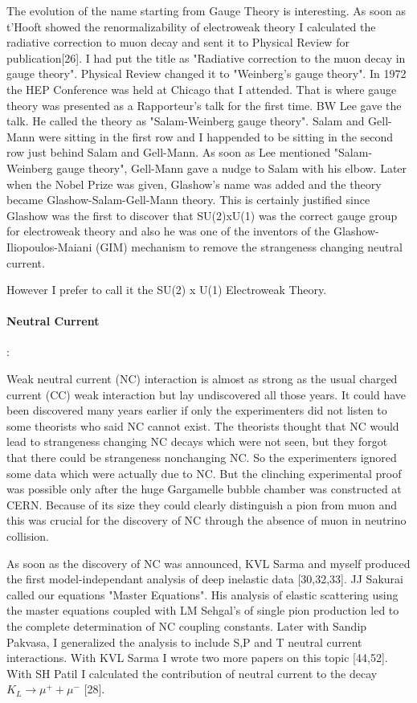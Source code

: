 The evolution of the name starting from Gauge Theory is interesting. As 
soon as t'Hooft showed the renormalizability of electroweak theory I 
calculated the radiative correction to muon decay and sent it to 
Physical Review for publication[26]. I had put the title as "Radiative 
correction to the muon decay in gauge theory". Physical Review changed 
it to "Weinberg's gauge theory". In 1972 the HEP Conference was held at 
Chicago that I attended. That is where gauge theory was presented as a 
Rapporteur's talk for the first time. BW Lee gave the talk. He called 
the theory as "Salam-Weinberg gauge theory". Salam and Gell-Mann were 
sitting in the first row and I happended to be sitting in the second row 
just behind Salam and Gell-Mann. As soon as Lee mentioned 
"Salam-Weinberg gauge theory", Gell-Mann gave a nudge to Salam with his 
elbow. Later when the Nobel Prize was given, Glashow's name was added 
and the theory became Glashow-Salam-Gell-Mann theory. This is certainly 
justified since Glashow was the first to discover that SU(2)xU(1) was 
the correct gauge group for electroweak theory and also he was one of 
the inventors of the Glashow-Iliopoulos-Maiani (GIM) mechanism to remove 
the strangeness changing neutral current.

However I prefer to call it the SU(2) x U(1) Electroweak Theory.

\paragraph{Neutral Current}:

Weak neutral current (NC) interaction is almost as strong as the usual 
charged current (CC) weak interaction but lay undiscovered all those 
years. It could have been discovered many years earlier if only the 
experimenters did not listen to some theorists who said NC cannot exist. 
The theorists thought that NC would lead to strangeness changing NC 
decays which were not seen, but they forgot that there could be 
strangeness nonchanging NC. So the experimenters ignored some data which 
were actually due to NC. But the clinching experimental proof was 
possible only after the huge Gargamelle bubble chamber was constructed 
at CERN. Because of its size they could clearly distinguish a pion from 
muon and this was crucial for the discovery of NC through the absence of 
muon in neutrino collision.

As soon as the discovery of NC was announced, KVL Sarma and myself 
produced the first model-independant analysis of deep inelastic data 
[30,32,33]. JJ Sakurai called our equations "Master Equations". His 
analysis of elastic scattering using the master equations coupled with 
LM Sehgal's of single pion production led to the complete determination 
of NC coupling constants. Later with Sandip Pakvasa, I generalized the 
analysis to include S,P and T neutral current interactions. With KVL 
Sarma I wrote two more papers on this topic [44,52]. With SH Patil I 
calculated the contribution of neutral current to the decay $K_L \rightarrow
\mu^+ + \mu^-$ [28].

